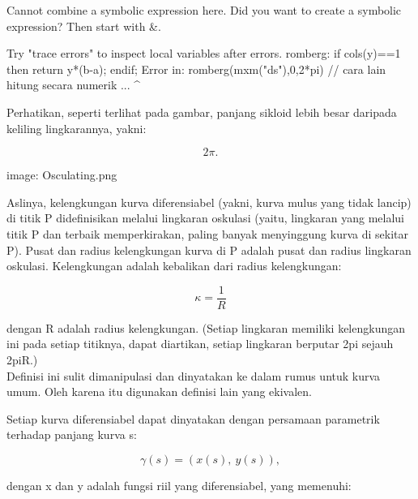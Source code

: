 \documentclass[a4paper,10pt]{article}
\begin{document}
\begin{eulernotebook}
\begin{eulercomment}
\begin{eulercomment}
\begin{eulercomment}
\begin{eulercomment}
\begin{euleroutput}
  Cannot combine a symbolic expression here.
  Did you want to create a symbolic expression?
  Then start with &.
  
  Try "trace errors" to inspect local variables after errors.
  romberg:
      if cols(y)==1 then return y*(b-a); endif;
  Error in:
  romberg(mxm("ds"),0,2*pi) // cara lain hitung secara numerik ...
                           ^
\end{euleroutput}
\begin{eulercomment}
Perhatikan, seperti terlihat pada gambar, panjang sikloid lebih besar daripada keliling lingkarannya, yakni:

\end{eulercomment}
\begin{eulerformula}
\[
2\pi.
\]
\end{eulerformula}
\begin{eulercomment}
image: Osculating.png

Aslinya, kelengkungan kurva diferensiabel (yakni, kurva mulus yang tidak lancip) di titik P didefinisikan melalui lingkaran
oskulasi (yaitu, lingkaran yang melalui titik P dan terbaik memperkirakan, paling banyak menyinggung kurva di sekitar P). Pusat
dan radius kelengkungan kurva di P adalah pusat dan radius lingkaran oskulasi. Kelengkungan adalah kebalikan dari radius
kelengkungan:

\end{eulercomment}
\begin{eulerformula}
\[
\kappa =\frac {1}{R}
\]
\end{eulerformula}
\begin{eulercomment}
dengan R adalah radius kelengkungan. (Setiap lingkaran memiliki kelengkungan ini pada setiap titiknya, dapat diartikan, setiap
lingkaran berputar 2pi sejauh 2piR.)\\
Definisi ini sulit dimanipulasi dan dinyatakan ke dalam rumus untuk kurva umum. Oleh karena itu digunakan definisi lain yang
ekivalen.

\end{eulercomment}
\begin{eulercomment}
Setiap kurva diferensiabel dapat dinyatakan dengan persamaan parametrik terhadap panjang kurva s:

\end{eulercomment}
\begin{eulerformula}
\[
\gamma(s) = (x(s),\ y(s)),
\]
\end{eulerformula}
\begin{eulercomment}
dengan x dan y adalah fungsi riil yang diferensiabel, yang memenuhi:


\end{eulercomment}
\end{eulercomment}
\end{eulercomment}
\end{eulercomment}
\end{eulercomment}
\end{eulernotebook}
\end{document}
